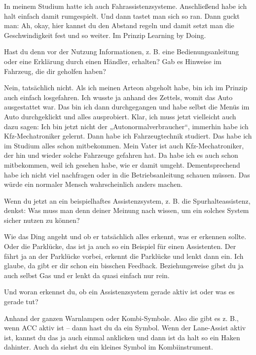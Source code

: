 In meinem Studium hatte ich auch Fahrassistenzsysteme. Anschließend habe
ich halt einfach damit rumgespielt. Und dann tastet man sich so ran.
Dann guckt man: Ah, okay, hier kannst du den Abstand regeln und damit
setzt man die Geschwindigkeit fest und so weiter. Im Prinzip Learning
by Doing.

\interviewerin
Hast du denn vor der Nutzung Informationen, z. B. eine
Bedienungsanleitung oder eine Erklärung durch einen Händler, erhalten?
Gab es Hinweise im Fahrzeug, die dir geholfen haben?

Nein, tatsächlich nicht. Als ich meinen Arteon abgeholt habe, bin ich im
Prinzip auch einfach losgefahren. Ich wusste ja anhand des Zettels,
womit das Auto ausgestattet war. Das bin ich dann durchgegangen und habe
selbst die Menüs im Auto durchgeklickt und alles ausprobiert. Klar, ich
muss jetzt vielleicht auch dazu sagen: Ich bin jetzt nicht der
„Autonormalverbraucher“, immerhin habe ich Kfz-Mechatroniker gelernt.
Dann habe ich Fahrzeugtechnik studiert. Das habe ich im Studium alles
schon mitbekommen. Mein Vater ist auch Kfz-Mechatroniker, der hin und
wieder solche Fahrzeuge gefahren hat. Da habe ich es auch schon
mitbekommen, weil ich gesehen habe, wie er damit umgeht. Dementsprechend
habe ich nicht viel nachfragen oder in die Betriebsanleitung schauen
müssen. Das würde ein normaler Mensch wahrscheinlich anders machen.

\interviewerin
Wenn du jetzt an ein beispielhaftes Assistenzsystem, z. B. die
Spurhalteassistenz, denkst: Was muss man denn deiner Meinung nach wissen,
um ein solches System sicher nutzen zu können?

Wie das Ding angeht und ob er tatsächlich alles erkennt, was er erkennen
sollte. Oder die Parklücke, das ist ja auch so ein Beispiel für einen
Assistenten. Der fährt ja an der Parklücke vorbei, erkennt die Parklücke
und lenkt dann ein. Ich glaube, da gibt er dir schon ein bisschen
Feedback. Beziehungsweise gibst du ja auch selbst Gas und er lenkt da
quasi einfach nur rein.

\interviewerin
Und woran erkennst du, ob ein Assistenzsystem gerade aktiv ist oder was
es gerade tut?

Anhand der ganzen Warnlampen oder Kombi-Symbole. Also die gibt es z. B.,
wenn ACC aktiv ist – dann hast du da ein Symbol. Wenn der Lane-Assist
aktiv ist, kannst du das ja auch einmal anklicken und dann ist da halt
so ein Haken dahinter. Auch da siehst du ein kleines Symbol im
Kombiinstrument.

